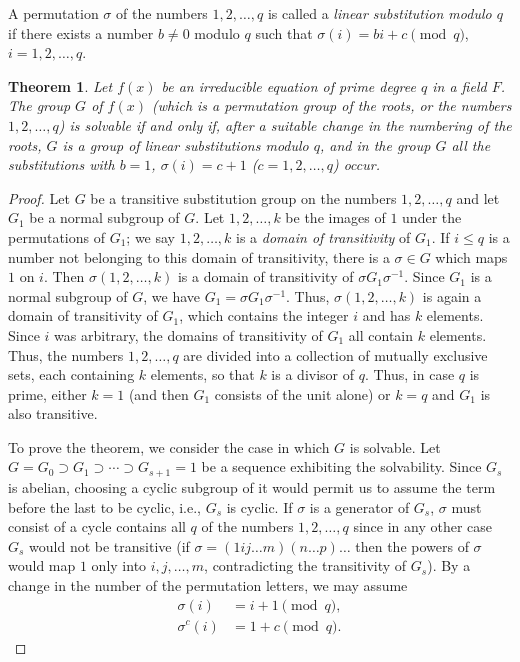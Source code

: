 \documentclass[10pt,leqno]{article}
\newtheorem{theo}{Theorem}
\theoremstyle{definition}
\begin{document}
A permutation $\sigma$ of the numbers $1,2,\ldots,q$ is called a \emph{linear substitution modulo $q$} if there exists a number $b \not= 0$ modulo $q$ such that $\sigma(i) = bi + c \pmod{q}$, $i=1,2,\ldots,q$.


\begin{theo}
\label{theo:III.7}
Let $f(x)$ be an irreducible equation of prime degree $q$ in a field $F$.
The group $G$ of $f(x)$ (which is a permutation group of the roots, or the numbers $1,2,\ldots,q$) is solvable if and only if, after a suitable change in the numbering of the roots, $G$ is a group of linear substitutions modulo $q$, and in the group $G$ all the substitutions with $b = 1$, $\sigma(i) = c + 1$ ($c = 1,2,\ldots,q$) occur.
\end{theo}


\begin{proof}
Let $G$ be a transitive substitution group on the numbers $1,2,\ldots,q$ and let $G_1$ be a normal subgroup of $G$.
Let $1,2,\ldots,k$ be the images of $1$ under the permutations of $G_1$; we say $1,2,\ldots,k$ is a \emph{domain of transitivity} of $G_1$.
If $i \leq q$ is a number not belonging to this domain of transitivity, there is a $\sigma \in G$ which maps $1$ on $i$.
Then $\sigma(1,2,\ldots,k)$ is a domain of transitivity of $\sigma G_1 \sigma^{-1}$.
Since $G_1$ is a normal subgroup of $G$, we have $G_1 = \sigma G_1 \sigma^{-1}$.
Thus, $\sigma(1,2,\ldots,k)$ is again a domain of transitivity of $G_1$, which contains the integer $i$ and has $k$ elements.
Since $i$ was arbitrary, the domains of transitivity of $G_1$ all contain $k$ elements.
Thus, the numbers $1,2,\ldots,q$ are divided into a collection of mutually exclusive sets, each containing $k$ elements, so that $k$ is a divisor of $q$.
Thus, in case $q$ is prime, either $k = 1$ (and then $G_1$ consists of the unit alone) or $k = q$ and $G_1$ is also transitive.

To prove the theorem, we consider the case in which $G$ is solvable.
Let $G = G_0 \supset G_1 \supset \cdots \supset G_{s+1} = 1$ be a sequence exhibiting the solvability.
Since $G_s$ is abelian, choosing a cyclic subgroup of it would permit us to assume the term before the last to be cyclic, i.e., $G_s$ is cyclic.
If $\sigma$ is a generator of $G_s$, $\sigma$ must consist of a cycle contains all $q$ of the numbers $1,2,\ldots,q$ since in any other case $G_s$ would not be transitive (if $\sigma = (1ij\ldots m)(n \ldots p)\ldots$ then the powers of $\sigma$ would map $1$ only into $i,j,\ldots,m$, contradicting the transitivity of $G_s$).
By a change in the number of the permutation letters, we may assume
\begin{align*}
\sigma(i) &= i + 1 \pmod q,
\\
\sigma^c(i) &= 1 + c \pmod q.
\end{align*}


\end{proof}
\end{document}
